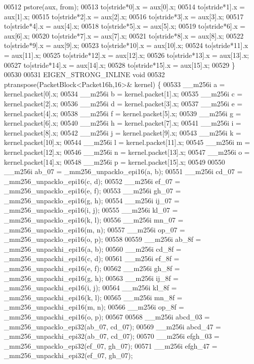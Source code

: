 \begin{DoxyCode}
00512   pstore(aux, from);
00513   to[stride*0].x = aux[0].x;
00514   to[stride*1].x = aux[1].x;
00515   to[stride*2].x = aux[2].x;
00516   to[stride*3].x = aux[3].x;
00517   to[stride*4].x = aux[4].x;
00518   to[stride*5].x = aux[5].x;
00519   to[stride*6].x = aux[6].x;
00520   to[stride*7].x = aux[7].x;
00521   to[stride*8].x = aux[8].x;
00522   to[stride*9].x = aux[9].x;
00523   to[stride*10].x = aux[10].x;
00524   to[stride*11].x = aux[11].x;
00525   to[stride*12].x = aux[12].x;
00526   to[stride*13].x = aux[13].x;
00527   to[stride*14].x = aux[14].x;
00528   to[stride*15].x = aux[15].x;
00529 \}
00530 
00531 EIGEN\_STRONG\_INLINE \textcolor{keywordtype}{void}
00532 ptranspose(PacketBlock<Packet16h,16>& kernel) \{
00533   \_\_m256i a = kernel.packet[0].x;
00534   \_\_m256i b = kernel.packet[1].x;
00535   \_\_m256i c = kernel.packet[2].x;
00536   \_\_m256i d = kernel.packet[3].x;
00537   \_\_m256i e = kernel.packet[4].x;
00538   \_\_m256i f = kernel.packet[5].x;
00539   \_\_m256i g = kernel.packet[6].x;
00540   \_\_m256i h = kernel.packet[7].x;
00541   \_\_m256i i = kernel.packet[8].x;
00542   \_\_m256i j = kernel.packet[9].x;
00543   \_\_m256i k = kernel.packet[10].x;
00544   \_\_m256i l = kernel.packet[11].x;
00545   \_\_m256i m = kernel.packet[12].x;
00546   \_\_m256i n = kernel.packet[13].x;
00547   \_\_m256i o = kernel.packet[14].x;
00548   \_\_m256i p = kernel.packet[15].x;
00549 
00550   \_\_m256i ab\_07 = \_mm256\_unpacklo\_epi16(a, b);
00551   \_\_m256i cd\_07 = \_mm256\_unpacklo\_epi16(c, d);
00552   \_\_m256i ef\_07 = \_mm256\_unpacklo\_epi16(e, f);
00553   \_\_m256i gh\_07 = \_mm256\_unpacklo\_epi16(g, h);
00554   \_\_m256i ij\_07 = \_mm256\_unpacklo\_epi16(i, j);
00555   \_\_m256i kl\_07 = \_mm256\_unpacklo\_epi16(k, l);
00556   \_\_m256i mn\_07 = \_mm256\_unpacklo\_epi16(m, n);
00557   \_\_m256i op\_07 = \_mm256\_unpacklo\_epi16(o, p);
00558 
00559   \_\_m256i ab\_8f = \_mm256\_unpackhi\_epi16(a, b);
00560   \_\_m256i cd\_8f = \_mm256\_unpackhi\_epi16(c, d);
00561   \_\_m256i ef\_8f = \_mm256\_unpackhi\_epi16(e, f);
00562   \_\_m256i gh\_8f = \_mm256\_unpackhi\_epi16(g, h);
00563   \_\_m256i ij\_8f = \_mm256\_unpackhi\_epi16(i, j);
00564   \_\_m256i kl\_8f = \_mm256\_unpackhi\_epi16(k, l);
00565   \_\_m256i mn\_8f = \_mm256\_unpackhi\_epi16(m, n);
00566   \_\_m256i op\_8f = \_mm256\_unpackhi\_epi16(o, p);
00567 
00568   \_\_m256i abcd\_03 = \_mm256\_unpacklo\_epi32(ab\_07, cd\_07);
00569   \_\_m256i abcd\_47 = \_mm256\_unpackhi\_epi32(ab\_07, cd\_07);
00570   \_\_m256i efgh\_03 = \_mm256\_unpacklo\_epi32(ef\_07, gh\_07);
00571   \_\_m256i efgh\_47 = \_mm256\_unpackhi\_epi32(ef\_07, gh\_07);

\end{DoxyCode}
